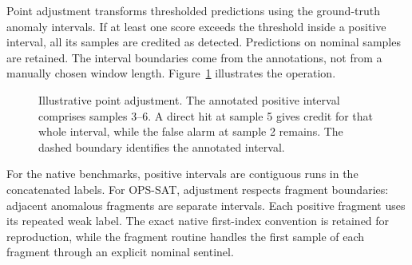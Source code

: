 Point adjustment transforms thresholded predictions using the ground-truth
anomaly intervals. If at least one score exceeds the threshold inside a
positive interval, all its samples are credited as detected. Predictions
on nominal samples are retained. The interval boundaries come from the
annotations, not from a manually chosen window length. Figure~\ref{fig:datasets-pa}
illustrates the operation.

\begin{figure}[htbp]
  \centering
  \caption{Illustrative point adjustment. The annotated positive interval
  comprises samples \num{3}--\num{6}. A direct hit at sample \num{5} gives
  credit for that whole interval, while the false alarm at sample \num{2}
  remains. The dashed boundary identifies the annotated interval.}
  \label{fig:datasets-pa}
\end{figure}

For the native benchmarks, positive intervals are contiguous runs in the
concatenated labels. For \ac{OPS-SAT}, adjustment respects fragment boundaries:
adjacent anomalous fragments are separate intervals. Each positive fragment
uses its repeated weak label. The exact native first-index convention is
retained for reproduction, while the fragment routine handles the first
sample of each fragment through an explicit nominal sentinel.

